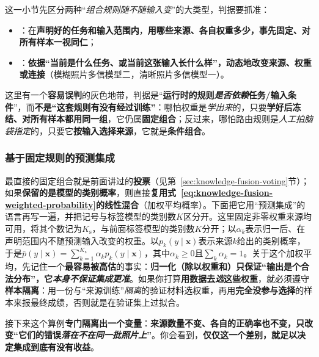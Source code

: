 这一小节先区分两种“\emph{组合规则随不随输入变}”的大类型，判据要抓准：
\begin{itemize}\item {}：在\textbf{声明好的任务和输入范围内}，\textbf{用哪些来源、各自权重多少，事先固定、对所有样本一视同仁}；\item {}：\textbf{依据“当前是什么任务、或当前这张输入长什么样”，动态地改变来源、权重或连接}（模糊照片多信模型二，清晰照片多信模型一）。\end{itemize}
这里有一个\textbf{容易误判}的灰色地带，判据是“\textbf{运行时的规则\emph{是否依赖}任务/输入条件}”，而\textbf{不是“这套规则有没有经过训练”}：哪怕权重是\emph{学出来}的，只要\textbf{学好后冻结、对所有样本都用同一组}，它仍属\textbf{固定组合}；反过来，哪怕路由规则是\emph{人工拍脑袋指定}的，只要它\textbf{按输入选择来源}，它就是\textbf{条件组合}。

\subsubsection{基于固定规则的预测集成}
\label{sec:ket-integration-fixed-prediction}

最直接的固定组合就是前面讲过的\textbf{投票}（见第~\ref{sec:knowledge-fusion-voting}节）；如果\textbf{保留的是模型的类别概率}，则直接\textbf{复用式~\eqref{eq:knowledge-fusion-weighted-probability}的线性混合}（加权平均概率）。下面把它用“预测集成”的语言再写一遍，并把记号与标签模型的类别数$K$区分开。这里固定非零权重来源均可用，将其个数记为$K_{\mathrm{s}}$，与前面标签模型的类别数$K$分开；以$\alpha_k$表示归一后、在声明范围内不随预测输入改变的权重。以$p_k(y\mid\bm{x})$表示来源$k$给出的类别概率，于是$\bar p(y\mid\bm{x})=\sum_{k=1}^{K_{\mathrm{s}}}\alpha_kp_k(y\mid\bm{x})$，其中$\alpha_k\geq0$且$\sum_k\alpha_k=1$。关于这个加权平均，先记住一个\textbf{最容易被高估}的事实：\textbf{归一化（除以权重和）只保证“输出是个合法分布”，它\emph{本身不保证集成更准}}。如果你打算\textbf{用数据去\emph{选}这些权重}，就必须遵守\textbf{样本隔离}：用一份与“来源训练”\emph{隔离}的验证材料选权重，再用\textbf{完全没参与选择}的样本来报最终成绩，否则就是在验证集上过拟合。

接下来这个算例\textbf{专门隔离出一个变量}：\textbf{来源数量不变、各自的正确率也不变，只改变“它们的错误\emph{落在不在同一批照片上}”}。你会看到，\textbf{仅仅这一个差别，就足以决定集成到底有没有收益}。

